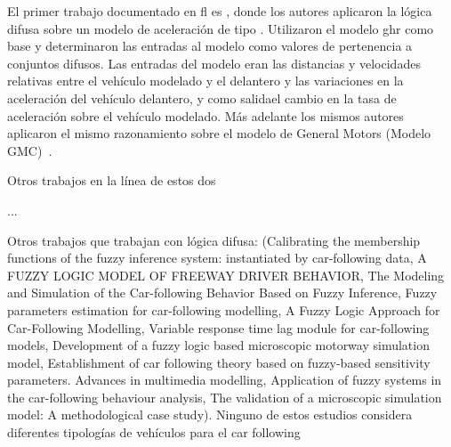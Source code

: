 El primer trabajo documentado en \gls{fl} es \cite{Kikuchi1992}, donde los autores aplicaron la lógica difusa sobre un modelo de aceleración de tipo \textit{}. Utilizaron el modelo \gls{ghr} como base y determinaron las entradas al modelo como valores de pertenencia a conjuntos difusos. Las entradas del modelo eran las distancias y velocidades relativas entre el vehículo modelado y el delantero y las variaciones en la aceleración del vehículo delantero, y como salidael cambio en la tasa de aceleración sobre el vehículo modelado. Más adelante los mismos autores aplicaron el mismo razonamiento sobre el modelo de General Motors (Modelo GMC)~\cite{Chakroborty1999}.

Otros trabajos en la línea de estos dos 

...

Otros trabajos que trabajan con lógica difusa: (Calibrating the membership functions of the fuzzy inference system: instantiated by car-following data, A FUZZY LOGIC MODEL OF FREEWAY DRIVER BEHAVIOR, The Modeling and Simulation of the Car-following Behavior Based on Fuzzy Inference, Fuzzy parameters estimation for car-following modelling, A Fuzzy Logic Approach for Car-Following Modelling, Variable response time lag module for car-following models, Development of a fuzzy logic based microscopic motorway simulation model, Establishment of car following theory based on fuzzy-based sensitivity parameters. Advances in multimedia modelling, Application of fuzzy systems in the car-following behaviour analysis, The validation of a microscopic simulation model: A methodological case study). Ninguno de estos estudios considera diferentes tipologías de vehículos para el car following


